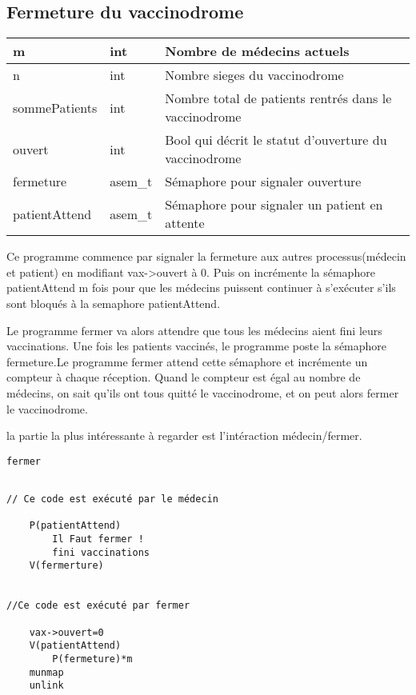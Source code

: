 \documentclass[a4paper]{article}
\makeatletter
\newenvironment{expl}{%
  \begin{list}{}{%
      \small\itshape%
      \topsep\z@%
      \listparindent0pt%
      \parsep0.75\baselineskip%
      \setlength{\leftmargin}{20mm}%
      \setlength{\rightmargin}{20mm}%
    }
  \item[]}%
  {\end{list}}
\makeatother
\begin{document}
\subsection{Fermeture du vaccinodrome}

\begin{expl}

\begin{tabularx}{\linewidth}{|l|l|>{\strut}X|}
      \hline%
        m & int & Nombre de médecins actuels \\ \hline%
        n & int & Nombre sieges du vaccinodrome \\ \hline%
        sommePatients & int  & Nombre total de patients rentrés dans le vaccinodrome \\ \hline%
        ouvert & int & Bool qui décrit le statut d'ouverture du vaccinodrome \\ \hline%
        fermeture & asem\_t  & Sémaphore pour signaler ouverture \\ \hline%
        patientAttend & asem\_t & Sémaphore pour signaler un patient en attente \\ \hline%
    \end{tabularx}
    

    
  Ce programme commence par signaler la fermeture aux autres processus(médecin et patient) en modifiant vax->ouvert à 0.
  Puis on incrémente la sémaphore patientAttend m fois pour que les médecins puissent continuer à s'exécuter s'ils sont bloqués à 
  la semaphore patientAttend.
  
  
  Le programme fermer va alors attendre que tous les médecins aient fini leurs vaccinations.
  Une fois les patients vaccinés, le programme poste la sémaphore fermeture.Le programme fermer attend cette sémaphore et incrémente un compteur à chaque réception. 
  Quand le compteur est égal au nombre de médecins, on sait qu'ils ont tous quitté le vaccinodrome, et on peut alors fermer le vaccinodrome.
  
  la partie la plus intéressante à regarder est l'intéraction médecin/fermer.
  
  \texttt{fermer}
  \begin{verbatim}
    
// Ce code est exécuté par le médecin
    
    P(patientAttend)
        Il Faut fermer !
        fini vaccinations 
    V(fermerture)
    
    
//Ce code est exécuté par fermer
    
    vax->ouvert=0
    V(patientAttend)
        P(fermeture)*m
    munmap
    unlink
    
\end{verbatim}
\end{expl}
\end{document}
